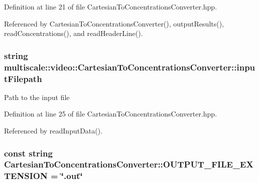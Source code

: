 \-Definition at line 21 of file \-Cartesian\-To\-Concentrations\-Converter.\-hpp.



\-Referenced by \-Cartesian\-To\-Concentrations\-Converter(), output\-Results(), read\-Concentrations(), and read\-Header\-Line().

\hypertarget{classmultiscale_1_1video_1_1CartesianToConcentrationsConverter_affebbc7e1c67692bd529f19fc0451e58}{
\subsubsection[{input\-Filepath}]{\setlength{\rightskip}{0pt plus 5cm}string {\bf multiscale\-::video\-::\-Cartesian\-To\-Concentrations\-Converter\-::input\-Filepath}}}\label{classmultiscale_1_1video_1_1CartesianToConcentrationsConverter_affebbc7e1c67692bd529f19fc0451e58}
\-Path to the input file 

\-Definition at line 25 of file \-Cartesian\-To\-Concentrations\-Converter.\-hpp.



\-Referenced by read\-Input\-Data().

\hypertarget{classmultiscale_1_1video_1_1CartesianToConcentrationsConverter_ad412cf727ae7465d900365888fd19c4d}{
\subsubsection[{\-O\-U\-T\-P\-U\-T\-\_\-\-F\-I\-L\-E\-\_\-\-E\-X\-T\-E\-N\-S\-I\-O\-N}]{\setlength{\rightskip}{0pt plus 5cm}const string {\bf \-Cartesian\-To\-Concentrations\-Converter\-::\-O\-U\-T\-P\-U\-T\-\_\-\-F\-I\-L\-E\-\_\-\-E\-X\-T\-E\-N\-S\-I\-O\-N} = \char`\"{}.out\char`\"{}}}\label{classmultiscale_1_1video_1_1CartesianToConcentrationsConverter_ad412cf727ae7465d900365888fd19c4d}


